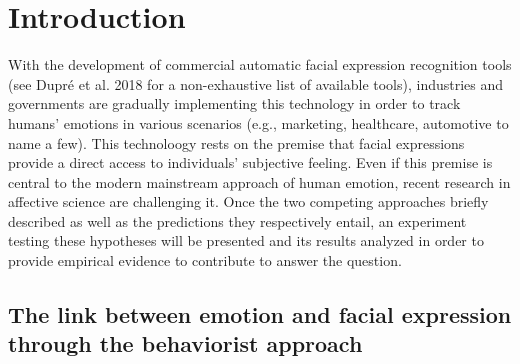 \documentclass[conference,final,]{IEEEtran}
\begin{document}




\maketitle


%
\IEEEpeerreviewmaketitle


\hypertarget{introduction}{%
\section{Introduction}\label{introduction}}

With the development of commercial automatic facial expression
recognition tools (see Dupré et al. 2018 for a non-exhaustive list of
available tools), industries and governments are gradually implementing
this technology in order to track humans' emotions in various scenarios
(e.g., marketing, healthcare, automotive to name a few). This
technoloogy rests on the premise that facial expressions provide a
direct access to individuals' subjective feeling. Even if this premise
is central to the modern mainstream approach of human emotion, recent
research in affective science are challenging it. Once the two competing
approaches briefly described as well as the predictions they
respectively entail, an experiment testing these hypotheses will be
presented and its results analyzed in order to provide empirical
evidence to contribute to answer the question.

\hypertarget{the-link-between-emotion-and-facial-expression-through-the-behaviorist-approach}{%
\subsection{The link between emotion and facial expression through the
behaviorist
approach}\label{the-link-between-emotion-and-facial-expression-through-the-behaviorist-approach}}
\end{document}
